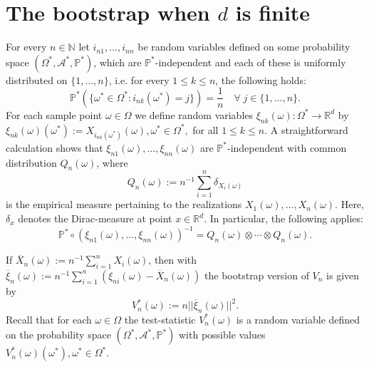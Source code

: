 \documentclass[sn-mathphys,Numbered]{sn-jnl}%
\theoremstyle{thmstyleone}%
\theoremstyle{thmstyletwo}%
\theoremstyle{thmstylethree}%
\begin{document}
\section{The bootstrap when $d$ is finite}
For every $n \in \mathbb{N}$ let $i_{n1},\ldots,i_{nn}$ be random variables defined on some probability space $(\Omega^*,\mathcal{A}^*,\mathbb{P}^*)$,
which are $\mathbb{P}^*$-independent and each of these is uniformly distributed on $\{1,\ldots,n\}$, i.e. for every $1 \le k \le n$, the following holds:
$$
  \mathbb{P}^*(\{\omega^* \in \Omega^*: i_{nk}(\omega^*)=j\})=\frac{1}{n} \quad \forall \; j \in \{1,\ldots,n\}.
$$
For each sample point $\omega \in \Omega$ we define random variables $\xi_{nk}(\omega):\Omega^* \rightarrow \mathbb{R}^d$ by
$\xi_{nk}(\omega)(\omega^*):=X_{i_{nk}(\omega^*)}(\omega), \omega^* \in \Omega^*,$ for all $1 \le k \le n.$ A straightforward calculation shows that
$\xi_{n1}(\omega),\ldots,\xi_{nn}(\omega)$ are $\mathbb{P}^*$-independent with common distribution $Q_n(\omega)$, where
\begin{equation} \label{defQn}
 Q_n(\omega):= n^{-1} \sum_{i=1}^n \delta_{X_i(\omega)}
\end{equation}
is the empirical measure pertaining to the realizations $X_1(\omega),\ldots,X_n(\omega)$. Here, $\delta_x$ denotes the Dirac-measure at point $x \in \mathbb{R}^d$. In particular, the following applies:
\begin{equation} \label{distribbootstrap}
\mathbb{P}^*\circ (\xi_{n1}(\omega),\ldots,\xi_{nn}(\omega))^{-1}=Q_n(\omega)\otimes \cdots \otimes Q_n(\omega).
\end{equation}


If $\overline{X}_n(\omega):= n^{-1} \sum_{i=1}^n X_i(\omega)$, then
with $\overline{\xi}_n(\omega):= n^{-1} \sum_{i=1}^n (\xi_{ni}(\omega)- \overline{X}_n(\omega))$
the bootstrap version of $V_n$ is given by
$$
 V_n^*(\omega):= n ||\overline{\xi}_n(\omega)||^2.
$$
Recall that for each $\omega \in \Omega$ the test-statistic $V_n^*(\omega)$ is a random variable defined on the probability space $(\Omega^*,\mathcal{A}^*,\mathbb{P}^*)$ with possible values $V_n^*(\omega)(\omega^*), \omega^* \in \Omega^*$.\\
\end{document}
